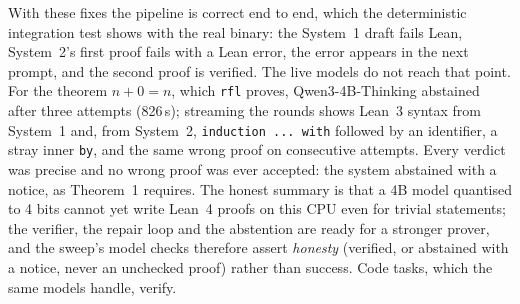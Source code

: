 With these fixes the pipeline is correct end to end, which the deterministic
integration test shows with the real binary: the System~1 draft fails Lean,
System~2's first proof fails with a Lean error, the error appears in the next
prompt, and the second proof is verified. The live models do not reach that
point. For the theorem $n+0=n$, which \texttt{rfl} proves, Qwen3-4B-Thinking
abstained after three attempts (826\,s); streaming the rounds shows Lean~3
syntax from System~1 and, from System~2, \texttt{induction ... with} followed by
an identifier, a stray inner \texttt{by}, and the same wrong proof on consecutive
attempts. Every verdict was precise and no wrong proof was ever accepted: the
system abstained with a notice, as Theorem~1 requires. The honest summary is that
a 4B model quantised to 4 bits cannot yet write Lean~4 proofs on this CPU even
for trivial statements; the verifier, the repair loop and the abstention are
ready for a stronger prover, and the sweep's model checks therefore assert
\emph{honesty} (verified, or abstained with a notice, never an unchecked proof)
rather than success. Code tasks, which the same models handle, verify.
